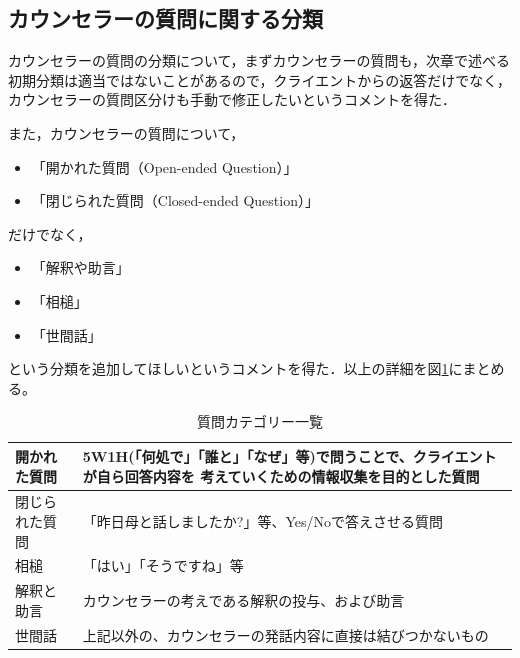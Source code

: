 \documentclass[shuuron]{kuee}
\begin{document}
\subsection{カウンセラーの質問に関する分類}

カウンセラーの質問の分類について，まずカウンセラーの質問も，次章で述べる初期分類は適当ではないことがあるので，クライエントからの返答だけでなく，カウンセラーの質問区分けも手動で修正したいというコメントを得た．

また，カウンセラーの質問について，
\begin{itemize}
  \item 「開かれた質問（Open-ended Question）」
  \item 「閉じられた質問（Closed-ended Question）」

\end{itemize}
だけでなく，
\begin{itemize}
  \item 「解釈や助言」
  \item 「相槌」
  \item 「世間話」
\end{itemize}

という分類を追加してほしいというコメントを得た．以上の詳細を図\ref{table:queCate}にまとめる。
\begin{table}
  \caption{質問カテゴリー一覧}
  \label{table:queCate}
  \begin{center}
    \begin{tabular}{|l|p{7cm}|} \hline
      開かれた質問 & 5W1H(「何処で」「誰と」「なぜ」等)で問うことで、クライエントが自ら回答内容を
      考えていくための情報収集を目的とした質問
      \\ \hline
      閉じられた質問  & 「昨日母と話しましたか?」等、Yes/Noで答えさせる質問
      \\ \hline
      相槌 & 「はい」「そうですね」等
      \\ \hline
      解釈と助言  &  カウンセラーの考えである解釈の投与、および助言\\ \hline
      世間話 & 上記以外の、カウンセラーの発話内容に直接は結びつかないもの \\ \hline
    \end{tabular}
  \end{center}
\end{table}

\end{document}
